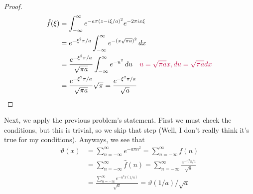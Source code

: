 \documentclass{homework}
\begin{document}
\begin{solution}
\begin{proof}
\begin{align*}
                                                                                                  {\hat {f}}(\xi ) &=\int_{-\infty}^\infty e^{-a\pi (z- i\xi/a)^2}e^{-2\pi i x\xi}\\
                                                                                                  &=  e^{-\xi^2\pi/a}\int _{-\infty }^{\infty} e^{-(x\sqrt{\pi a})^2} \,dx\\
                                                                                                  &=  \frac{e^{-\xi^2\pi/a}}{\sqrt{\pi a}}\int_{-\infty}^\infty e^{-u^2} \,du \quad \color{purple} u = \sqrt{\pi a}x, du = \sqrt{\pi a} dx\\
                                                                                                  &=  \frac{e^{-\xi^2\pi/a}}{\sqrt{\pi a}} \sqrt{\pi} =  \frac{e^{-\xi^2\pi/a}}{\sqrt{a}}
                                                                                                  \end{align*}
                                                                                                  \end{proof}
                                                                                                  Next, we apply the previous problem's statement. First we must check the conditions, but this is trivial, so we skip that step (Well, I don't really think it's true for my conditions). Anyways, we see that 
                                                                                                  \begin{align*}
                                                                                                  \vartheta(x) &= \sum_{n=-\infty}^{\infty} e^{-a\pi n^2} = \sum_{n=-\infty}^{\infty} f(n) \\
                                                                                                  &= \sum_{n=-\infty}^\infty \hat f(n) = \sum_{n=-\infty}^\infty \frac{e^{-n^2\pi/a}}{\sqrt{a}}\\
                                                                                                  &= \frac{\sum_{n=-\infty}^\infty e^{-n^2\pi(1/a)}}{\sqrt{a}} = \vartheta(1/a)/\sqrt{a}
                                                                                                  \end{align*}
                                                                                                  \end{solution}
\end{document}
